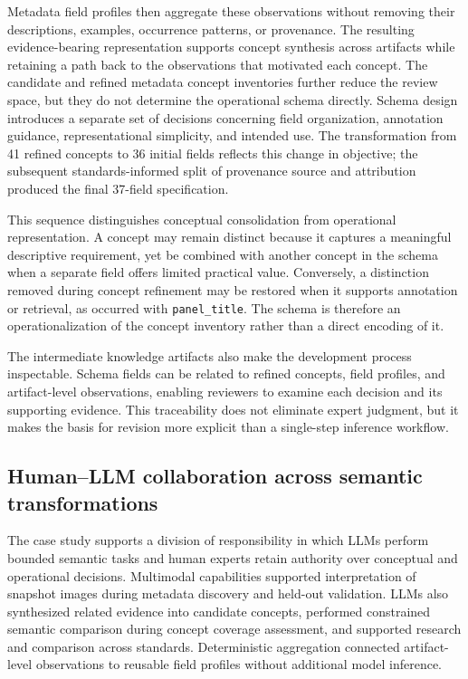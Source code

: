 \documentclass{article}
\begin{document}
Metadata field profiles then aggregate these observations without removing their descriptions, examples, occurrence patterns, or provenance. The resulting evidence-bearing representation supports concept synthesis across artifacts while retaining a path back to the observations that motivated each concept. The candidate and refined metadata concept inventories further reduce the review space, but they do not determine the operational schema directly. Schema design introduces a separate set of decisions concerning field organization, annotation guidance, representational simplicity, and intended use. The transformation from 41 refined concepts to 36 initial fields reflects this change in objective; the subsequent standards-informed split of provenance source and attribution produced the final 37-field specification.

This sequence distinguishes conceptual consolidation from operational representation. A concept may remain distinct because it captures a meaningful descriptive requirement, yet be combined with another concept in the schema when a separate field offers limited practical value. Conversely, a distinction removed during concept refinement may be restored when it supports annotation or retrieval, as occurred with \texttt{panel\_title}. The schema is therefore an operationalization of the concept inventory rather than a direct encoding of it.

The intermediate knowledge artifacts also make the development process inspectable. Schema fields can be related to refined concepts, field profiles, and artifact-level observations, enabling reviewers to examine each decision and its supporting evidence. This traceability does not eliminate expert judgment, but it makes the basis for revision more explicit than a single-step inference workflow.

\subsection{Human--LLM collaboration across semantic transformations}

The case study supports a division of responsibility in which LLMs perform bounded semantic tasks and human experts retain authority over conceptual and operational decisions. Multimodal capabilities supported interpretation of snapshot images during metadata discovery and held-out validation. LLMs also synthesized related evidence into candidate concepts, performed constrained semantic comparison during concept coverage assessment, and supported research and comparison across standards. Deterministic aggregation connected artifact-level observations to reusable field profiles without additional model inference.
\end{document}
